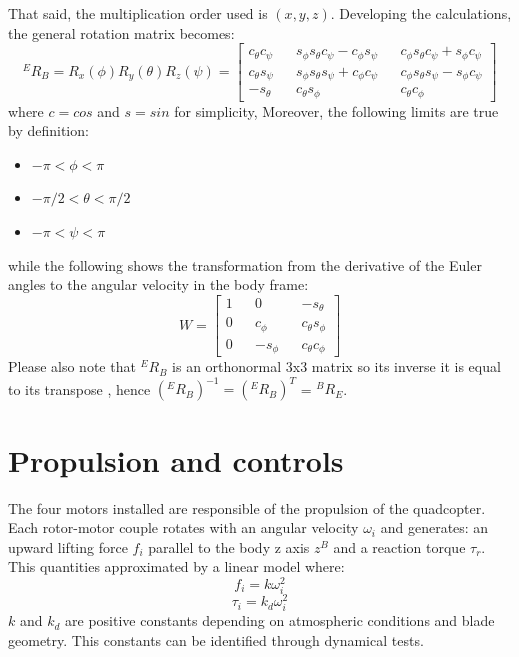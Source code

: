 \noindent
That said, the multiplication order used is $(x , y , z)$. Developing the calculations, the general rotation matrix becomes:\begin{equation}
{}^ER_B = R_x(\phi)R_y(\theta)R_z(\psi) = \begin{bmatrix} 
c_\theta c_\psi && s_\phi s_\theta c_\psi - c_\phi s _\psi &&  c_\phi s_\theta c_\psi + s_\phi c _\psi \\
c_\theta s_\psi&& s_\phi s_\theta s_\psi + c_\phi c _\psi && c_\phi s_\theta  s_\psi - s_\phi c _\psi \\
-s_\theta && c_\theta s_\phi  &&  c_\theta c_\phi 
\end{bmatrix}
\label{eq:rotmatrix}
\end{equation}where $c = cos$ and $s = sin$ for simplicity, Moreover, the following limits are true by definition: \begin{itemize}
\item $ -\pi < \phi < \pi$
\item $ -\pi/2 < \theta < \pi/2$
\item $ -\pi < \psi < \pi$
\end{itemize}
while the following shows the transformation from the derivative of the Euler angles to the angular velocity in the body frame\cite{Friis2009}:
\begin{equation}
W = \begin{bmatrix} 
1 && 0 && -s_\theta\\
0 && c_\phi && c_\theta s_\phi \\
0 && -s_\phi && c_\theta c_\phi
\end{bmatrix}
\end{equation}
Please also note that ${}^ER_B$ is an orthonormal 3x3 matrix so its inverse it is equal to its transpose \cite{Khalil2004}, hence $({}^ER_B)^{-1} = ({}^ER_B)^{T}$ = ${}^BR_E$.

\section{Propulsion and controls}
\label{sec:propulsion}

The four motors installed are responsible of the propulsion of the quadcopter. Each rotor-motor couple rotates with an angular velocity $\omega_i$ and generates: an upward lifting force $f_i$ parallel to the body z axis $z^B$ and a reaction torque $\tau_r$. This quantities approximated by a linear model where: \begin{equation}
f_i = k \omega_i ^ 2
\label{eq:fi}
\end{equation}
\begin{equation}
\tau_i = k_d \omega_i ^ 2
\label{eq:taui}
\end{equation}
$k$ and $k_d$ are positive constants depending on atmospheric conditions and blade geometry. This constants can be identified through dynamical tests.\\


